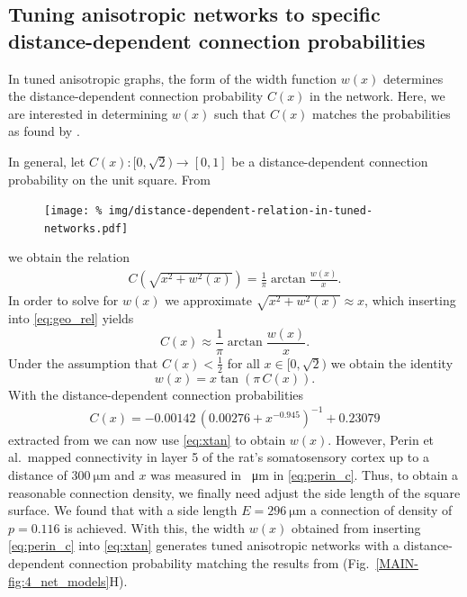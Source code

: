 
\bigskip

\subsection{Tuning anisotropic networks to specific distance-dependent
  connection probabilities}
\label{sec:tuned_networks}


In tuned anisotropic graphs, the form of the width function $w(x)$
determines the distance-dependent connection probability $C(x)$ in the
network. Here, we are interested in determining $w(x)$ such that
$C(x)$ matches the probabilities as found by \textcite{Perin2011}.

In general, let $C(x): [0,\sqrt{2}) \to [0,1]$ be a distance-dependent
  connection probability on the unit square. From

  \begin{figure}[h!]
    \centering
    \texttt{[image: \%
    img/distance-dependent-relation-in-tuned-networks.pdf]} %
  \end{figure}

 we obtain the relation
%
\begin{align}
C\left(\sqrt{x^2+w^2(x)}\right) = \frac{1}{\pi} \operatorname{arctan}
\frac{w(x)}{x}. \label{eq:geo_rel}
\end{align}
%
In order to solve for $w(x)$ we approximate $\sqrt{x^2 + w^2(x)}
\approx x$, which inserting into \eqref{eq:geo_rel} yields
\begin{equation}
C(x) \approx \frac{1}{\pi} \operatorname{arctan} \label{eq:tanapprox}
\frac{w(x)}{x}.
\end{equation}
%
Under the assumption that $C(x)<\frac{1}{2}$ for all $x \in
[0,\sqrt{2})$ we obtain the identity
\begin{equation}
  w(x) = x \tan\left( \pi\, C(x) \right). \label{eq:xtan}
\end{equation} 
%
With the distance-dependent connection probabilities
\begin{align}
  C(x) = -0.00142\, \left(0.00276 + x^{-0.945}\right)^{-1} + 0.23079
  \label{eq:perin_c}
\end{align}
%
extracted from \textcite{Perin2011} we can now use \eqref{eq:xtan} to
obtain $w(x)$. However, Perin et al.~mapped connectivity in layer 5 of
the rat's somatosensory cortex up to a distance of
$\SI{300}{\micro\meter}$ and $x$ was measured in \SI{}{\micro\meter}
in \eqref{eq:perin_c}. Thus, to obtain a reasonable connection
density, we finally need adjust the side length of the square
surface. We found that with a side length $E=\SI{296}{\micro\meter}$ a
connection of density of $p=0.116$ is achieved. With this, the width
$w(x)$ obtained from inserting \eqref{eq:perin_c} into \eqref{eq:xtan}
generates tuned anisotropic networks with a distance-dependent
connection probability matching the results from \cite{Perin2011}
(Fig.~\ref{MAIN-fig:4_net_models}H).



